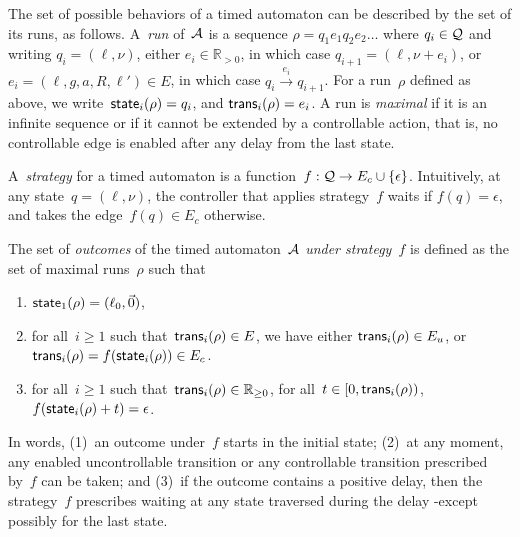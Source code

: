 \documentclass{article}
\begin{document}

The set of possible behaviors of a timed automaton can be described by the set
of its runs, as follows.
A~\emph{run} of~$\mathcal{A}$ is a sequence $\rho = q_1e_1q_2e_2\ldots$ where $q_i \in
\mathcal{Q}$
and writing $q_i = (\ell,\nu)$, either $e_i \in \mathbb{R}_{>0}$, in which case $q_{i+1}
= (\ell,\nu + e_i)$, or
$e_i =(\ell,g,a,R,\ell')\in E$, in which case 
$q_i \xrightarrow{e_i} q_{i+1}$.
For a run~$\rho$ defined as above, we write~$\textsf{state}_i(\rho) = q_i$, 
and $\textsf{trans}_i(\rho) = e_i$.
A run is \emph{maximal} if it is an infinite sequence or if it cannot be
extended by a controllable action, that is, no controllable edge is enabled
after any delay from the last state.

A~\emph{strategy} for a timed automaton is a 
function~$f : \mathcal{Q} \rightarrow E_c\cup\{\epsilon\}$.
Intuitively, at any state~$q=(\ell,\nu)$, the controller that applies
strategy~$f$ waits if $f(q)=\epsilon$, and takes the edge~$f(q) \in E_c$
otherwise.

The set of \emph{outcomes} of the timed automaton~$\mathcal{A}$ \emph{under
strategy~$f$} is defined as the set of maximal runs~$\rho$ such that
\begin{enumerate}
  \item $\textsf{state}_1(\rho) = (\ell_0,\vec{0})$,
  \item for all~$i\geq 1$ such that~$\textsf{trans}_i(\rho) \in E$, we have either
  $\textsf{trans}_i(\rho) \in E_u$, or $\textsf{trans}_i(\rho)
  = f(\textsf{state}_i(\rho)) \in E_c$.
  \item for all~$i\geq 1$ such that~$\textsf{trans}_i(\rho) \in \mathbb{R}_{\geq 0}$, for all~$t \in
  [0,\textsf{trans}_i(\rho))$, $f(\textsf{state}_i(\rho) + t) = \epsilon$.
\end{enumerate}
In words, (1)~an outcome under~$f$ starts in the initial state; (2)~at any moment,
any enabled uncontrollable transition or any controllable transition prescribed
by~$f$ can be taken; and (3)~if the outcome contains a positive delay, then the strategy~$f$ 
prescribes waiting at any state traversed during the delay -except possibly for the
last state.
\end{document}
